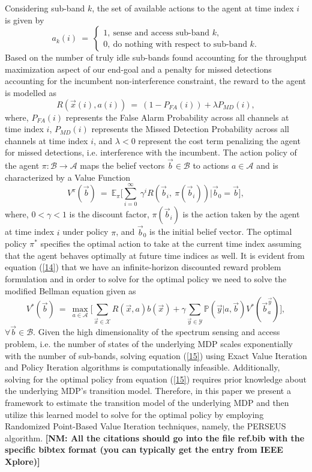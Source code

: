 \documentclass[10pt,twocolumn]{IEEEtran}
\newcommand{\nm}[1]{{\color{blue}\bf{[NM: #1]}}}
\begin{document}
Considering sub-band $k$, the set of available actions to the agent at time index $i$ is given by
\begin{equation}\label{12}
    a_k(i)\ =\ 
    \begin{cases}
        1,\ \text{sense and access sub-band $k$},\\
        0,\ \text{do nothing with respect to sub-band $k$}.
    \end{cases}
\end{equation}
Based on the number of truly idle sub-bands found accounting for the throughput maximization aspect of our end-goal and a penalty for missed detections accounting for the incumbent non-interference constraint, the reward to the agent is modelled as
\begin{equation}\label{13}
    R(\vec{x}(i),a(i))\ =\ (1 - P_{FA}(i)) + \lambda P_{MD}(i),
\end{equation}
where, $P_{FA}(i)$ represents the False Alarm Probability across all channels at time index $i$, $P_{MD}(i)$ represents the Missed Detection Probability across all channels at time index $i$, and $\lambda < 0$ represent the cost term penalizing the agent for missed detections, i.e. interference with the incumbent. The action policy of the agent $\pi: \mathcal{B} \rightarrow \mathcal{A}$ maps the belief vectors $\vec{b} \in \mathcal{B}$ to actions $a \in \mathcal{A}$ and is characterized by a Value Function
\begin{equation}\label{14}
    V^{\pi}(\vec{b})\ =\ \mathbb{E}_{\pi}\Big[\sum_{i=0}^{\infty}\ \gamma^i R(\vec{b}_i,\ \pi(\vec{b}_i))|\vec{b}_0=\vec{b}\Big],
\end{equation}
where, $0 < \gamma < 1$ is the discount factor, $\pi(\vec{b}_i)$ is the action taken by the agent at time index $i$ under policy $\pi$, and $\vec{b}_0$ is the initial belief vector. The optimal policy $\pi^*$ specifies the optimal action to take at the current time index assuming that the agent behaves optimally at future time indices as well. It is evident from equation (\ref{14}) that we have an infinite-horizon discounted reward problem formulation and in order to solve for the optimal policy we need to solve the modified Bellman equation given as
\begin{equation}\label{15}
    V^*(\vec{b})\ =\ \max_{a \in \mathcal{A}}\Big[\sum_{\vec{x} \in \mathcal{X}}R(\vec{x},a)b(\vec{x}) + \gamma \sum_{\vec{y} \in \mathcal{Y}}\mathbb{P}(\vec{y}|a,\vec{b})V^*(\vec{b}_a^{\vec{y}})\Big],
\end{equation}
$\forall \vec{b} \in \mathcal{B}$. Given the high dimensionality of the spectrum sensing and access problem, i.e. the number of states of the underlying MDP scales exponentially with the number of sub-bands, solving equation (\ref{15}) using Exact Value Iteration and Policy Iteration algorithms is computationally infeasible. Additionally, solving for the optimal policy from equation (\ref{15}) requires prior knowledge about the underlying MDP's transition model. Therefore, in this paper we present a framework to estimate the transition model of the underlying MDP and then utilize this learned model to solve for the optimal policy by employing Randomized Point-Based Value Iteration techniques, namely, the PERSEUS algorithm.
\nm{All the citations should go into the file ref.bib with the specific bibtex format (you can typically get the entry from IEEE Xplore)}

 
\end{document}
